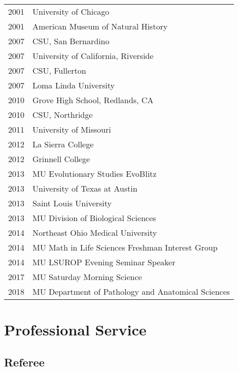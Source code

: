 \documentclass[10pt,letterpaper,]{article}
\begin{document}
\begin{tabular}{ll}
  2001 & University of Chicago \\ 
  2001 & American Museum of Natural History \\ 
  2007 & CSU, San Bernardino \\ 
  2007 & University of California, Riverside \\ 
  2007 & CSU, Fullerton \\ 
  2007 & Loma Linda University \\ 
  2010 & Grove High School, Redlands, CA \\ 
  2010 & CSU, Northridge \\ 
  2011 & University of Missouri \\ 
  2012 & La Sierra College \\ 
  2012 & Grinnell College \\ 
  2013 & MU Evolutionary Studies EvoBlitz \\ 
  2013 & University of Texas at Austin \\ 
  2013 & Saint Louis University \\ 
  2013 & MU Division of Biological Sciences \\ 
  2014 & Northeast Ohio Medical University \\ 
  2014 & MU Math in Life Sciences Freshman Interest Group \\ 
  2014 & MU LSUROP Evening Seminar Speaker \\ 
  2017 & MU Saturday Morning Science \\ 
  2018 & MU Department of Pathology and Anatomical Sciences \\ 
  \end{tabular}

\hypertarget{professional-service}{%
\section{Professional Service}\label{professional-service}}

\hypertarget{referee}{%
\subsection{Referee}\label{referee}}
\end{document}
